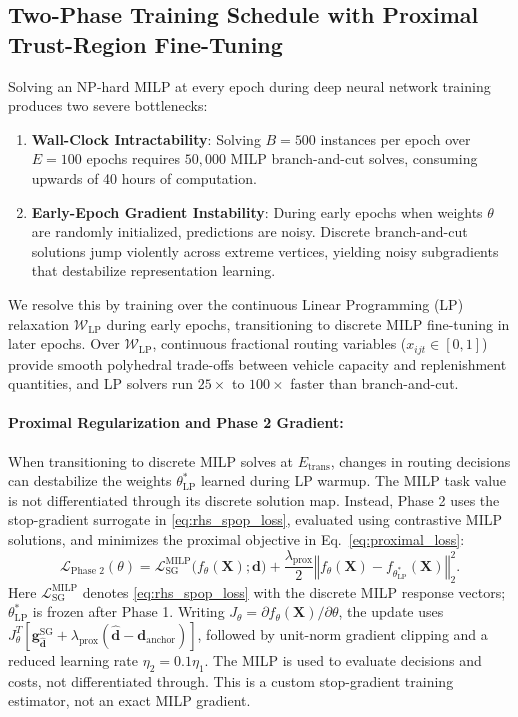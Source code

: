 \documentclass[11pt,a4paper]{article}
\theoremstyle{definition}
\theoremstyle{remark}
\begin{document}
\subsection{Two-Phase Training Schedule with Proximal Trust-Region Fine-Tuning}
Solving an NP-hard MILP at every epoch during deep neural network training produces two severe bottlenecks:
\begin{enumerate}[label=(\roman*)]
    \item \textbf{Wall-Clock Intractability}: Solving $B = 500$ instances per epoch over $E = 100$ epochs requires $50,000$ MILP branch-and-cut solves, consuming upwards of 40 hours of computation.
    \item \textbf{Early-Epoch Gradient Instability}: During early epochs when weights $\theta$ are randomly initialized, predictions are noisy. Discrete branch-and-cut solutions jump violently across extreme vertices, yielding noisy subgradients that destabilize representation learning.
\end{enumerate}

We resolve this by training over the continuous Linear Programming (LP) relaxation $\mathcal{W}_{\text{LP}}$ during early epochs, transitioning to discrete MILP fine-tuning in later epochs. Over $\mathcal{W}_{\text{LP}}$, continuous fractional routing variables ($x_{ijt} \in [0, 1]$) provide smooth polyhedral trade-offs between vehicle capacity and replenishment quantities, and LP solvers run $25\times$ to $100\times$ faster than branch-and-cut.

\paragraph{Proximal Regularization and Phase 2 Gradient:}
When transitioning to discrete MILP solves at $E_{\text{trans}}$, changes in routing decisions can destabilize the weights $\theta_{\text{LP}}^*$ learned during LP warmup. The MILP task value is not differentiated through its discrete solution map. Instead, Phase 2 uses the stop-gradient surrogate in \eqref{eq:rhs_spop_loss}, evaluated using contrastive MILP solutions, and minimizes the proximal objective in Eq.~\eqref{eq:proximal_loss}:
\begin{equation}
    \mathcal{L}_{\text{Phase 2}}(\theta) = \mathcal{L}_{\text{SG}}^{\text{MILP}}\big(f_\theta(\mathbf{X}); \mathbf{d}\big) + \frac{\lambda_{\text{prox}}}{2} \left\Vert f_\theta(\mathbf{X}) - f_{\theta_{\text{LP}}^*}(\mathbf{X}) \right\Vert_2^2. \label{eq:proximal_loss}
\end{equation}
Here $\mathcal{L}_{\text{SG}}^{\text{MILP}}$ denotes \eqref{eq:rhs_spop_loss} with the discrete MILP response vectors; $\theta_{\text{LP}}^*$ is frozen after Phase 1. Writing $J_\theta = \partial f_\theta(\mathbf{X})/\partial\theta$, the update uses $J_\theta^T[\mathbf{g}_{\hat{\mathbf{d}}}^{\text{SG}} + \lambda_{\text{prox}}(\hat{\mathbf{d}}-\mathbf{d}_{\text{anchor}})]$, followed by unit-norm gradient clipping and a reduced learning rate $\eta_2 = 0.1\eta_1$. The MILP is used to evaluate decisions and costs, not differentiated through. This is a custom stop-gradient training estimator, not an exact MILP gradient.
\end{document}

